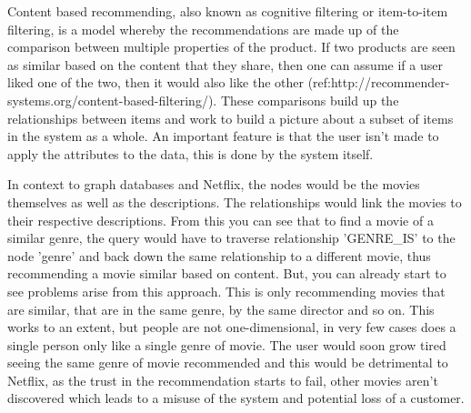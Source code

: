 \documentclass[a4paper]{article}
\begin{document}
Content based recommending, also known as cognitive filtering or item-to-item filtering, is a model whereby the recommendations are made up of the comparison between multiple properties of the product. If two products are seen as similar based on the content that they share, then one can assume if a user liked one of the two, then it would also like the other (ref:http://recommender-systems.org/content-based-filtering/). These comparisons build up the relationships between items and work to build a picture about a subset of items in the system as a whole. An important feature is that the user isn't made to apply the attributes to the data, this is done by the system itself.

In context to graph databases and Netflix, the nodes would be the movies themselves as well as the descriptions. The relationships would link the movies to their respective descriptions. From this you can see that to find a movie of a similar genre, the query would have to traverse relationship 'GENRE\_IS' to the node 'genre' and back down the same relationship to a different movie, thus recommending a movie similar based on content. But, you can already start to see problems arise from this approach. This is only recommending movies that are similar, that are in the same genre, by the same director and so on. This works to an extent, but people are not one-dimensional, in very few cases does a single person only like a single genre of movie. The user would soon grow tired seeing the same genre of movie recommended and this would be detrimental to Netflix, as the trust in the recommendation starts to fail, other movies aren't discovered which leads to a misuse of the system and potential loss of a customer.
\end{document}

